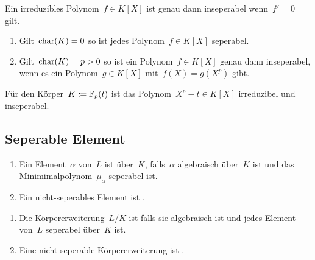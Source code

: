 \begin{lemma}
  Ein irreduzibles Polynom~$f \in K[X]$ ist genau dann inseperabel wenn~$f' = 0$ gilt.
\end{lemma}

\begin{proposition}
  \leavevmode
  \begin{enumerate}
    \item
      Gilt~$\operatorname{char}(K) = 0$ so ist jedes Polynom~$f \in K[X]$ seperabel.
    \item
      Gilt~$\operatorname{char}(K) = p > 0$ so ist ein Polynom~$f \in K[X]$ genau dann inseperabel, wenn es ein Polynom~$g \in K[X]$ mit~$f(X) = g(X^p)$ gibt.
  \end{enumerate}
\end{proposition}

\begin{example}
  Für den Körper~$K \coloneqq \mathbb{F}_p(t)$ ist das Polynom~$X^p - t \in K[X]$ irreduzibel und inseperabel.
\end{example}



\subsection{Seperable Element}

\begin{definition}
  \leavevmode
  \begin{enumerate}
    \item
      Ein Element~$\alpha$ von~$L$ ist  über~$K$, falls~$\alpha$ algebraisch über~$K$ ist und das Minimimalpolynom~$\mu_\alpha$ seperabel ist.
    \item
      Ein nicht-seperables Element ist .
  \end{enumerate}
\end{definition}

\begin{definition}
  \leavevmode
  \begin{enumerate}
    \item
      Die Körpererweiterung~$L/K$ ist  falls sie algebraisch ist und jedes Element von~$L$ seperabel über~$K$ ist.
    \item
      Eine nicht-seperable Körpererweiterung ist .
  \end{enumerate}
\end{definition}



